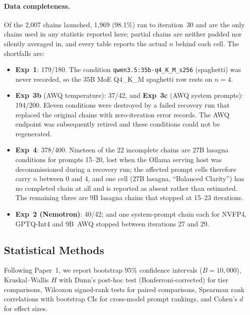 \documentclass[11pt]{article}
\begin{document}
\paragraph{Data completeness.}
Of the 2{,}007 chains launched, 1{,}969 (98.1\%) ran to iteration~30 and are
the only chains used in any statistic reported here; partial chains are
neither padded nor silently averaged in, and every table reports the actual
$n$ behind each cell. The shortfalls are:
\begin{itemize}[leftmargin=*]
  \item \textbf{Exp~1}: 179/180. The condition
        \texttt{qwen3.5:35b-q4\_K\_M\_s256} (spaghetti) was never recorded,
        so the 35B MoE Q4\_K\_M spaghetti row rests on $n=4$.
  \item \textbf{Exp~3b} (AWQ temperature): 37/42, and \textbf{Exp~3c}
        (AWQ system prompts): 194/200. Eleven conditions were destroyed by a
        failed recovery run that replaced the original chains with
        zero-iteration error records. The AWQ endpoint was subsequently
        retired and these conditions could not be regenerated.
  \item \textbf{Exp~4}: 378/400. Nineteen of the 22 incomplete chains are
        27B lasagna conditions for prompts 15--20, lost when the Ollama
        serving host was decommissioned during a recovery run; the affected
        prompt cells therefore carry $n$ between 0 and 4, and one cell
        (27B lasagna, ``Balanced Clarity'') has no completed chain at all
        and is reported as absent rather than estimated. The remaining
        three are 9B lasagna chains that stopped at 15--23 iterations.
  \item \textbf{Exp~2 (Nemotron)}: 40/42; and one system-prompt chain each
        for NVFP4, GPTQ-Int4 and 9B~AWQ stopped between iterations 27
        and 29.
\end{itemize}

\subsection{Statistical Methods}

Following Paper~1, we report bootstrap 95\% confidence intervals
($B = 10{,}000$), Kruskal--Wallis $H$ with Dunn's post-hoc test
(Bonferroni-corrected) for tier comparisons, Wilcoxon signed-rank tests
for paired comparisons, Spearman rank correlations with bootstrap CIs for
cross-model prompt rankings, and Cohen's $d$ for effect sizes.
\end{document}
